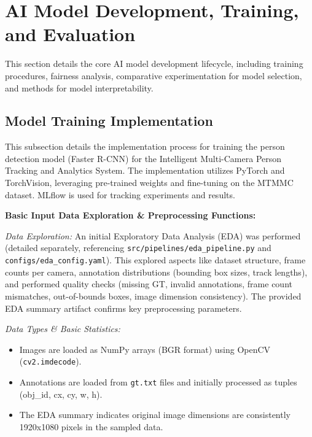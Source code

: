 \section{AI Model Development, Training, and Evaluation}
\label{section:ai_model_dev_train_eval}

This section details the core AI model development lifecycle, including training procedures, fairness analysis, comparative experimentation for model selection, and methods for model interpretability.

\subsection{Model Training Implementation}
\label{subsection:model_training_impl}
This subsection details the implementation process for training the person detection model (Faster R-CNN) for the Intelligent Multi-Camera Person Tracking and Analytics System. The implementation utilizes PyTorch and TorchVision, leveraging pre-trained weights and fine-tuning on the MTMMC dataset. MLflow is used for tracking experiments and results.

\textbf{Basic Input Data Exploration \& Preprocessing Functions:}

\textit{Data Exploration:} An initial Exploratory Data Analysis (EDA) was performed (detailed separately, referencing \texttt{src/pipelines/eda\_pipeline.py} and \texttt{configs/eda\_config.yaml}). This explored aspects like dataset structure, frame counts per camera, annotation distributions (bounding box sizes, track lengths), and performed quality checks (missing GT, invalid annotations, frame count mismatches, out-of-bounds boxes, image dimension consistency). The provided EDA summary artifact confirms key preprocessing parameters.

\textit{Data Types \& Basic Statistics:}
\begin{itemize}
    \item Images are loaded as NumPy arrays (BGR format) using OpenCV (\texttt{cv2.imdecode}).
    \item Annotations are loaded from \texttt{gt.txt} files and initially processed as tuples (obj\_id, cx, cy, w, h).
    \item The EDA summary indicates original image dimensions are consistently 1920x1080 pixels in the sampled data.
\end{itemize}

